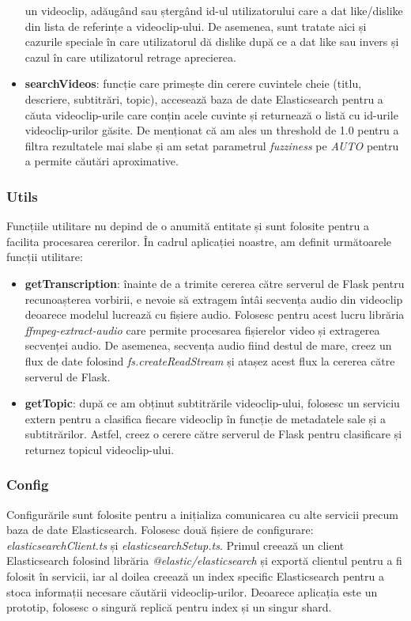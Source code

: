 \begin{itemize}
    un videoclip, adăugând sau ștergând id-ul utilizatorului care a dat like/dislike din lista de
    referințe a videoclip-ului. De asemenea, sunt tratate aici și cazurile speciale în care utilizatorul
    dă dislike după ce a dat like sau invers și cazul în care utilizatorul retrage aprecierea.
    \item \textbf{searchVideos}: funcție care primește din cerere cuvintele cheie (titlu, descriere,
    subtitrări, topic), accesează baza de date Elasticsearch pentru a căuta videoclip-urile care conțin
    acele cuvinte și returnează o listă cu id-urile videoclip-urilor găsite. De menționat că am ales
    un threshold de 1.0 pentru a filtra rezultatele mai slabe și am setat parametrul \textit{fuzziness} 
    pe \textit{AUTO} pentru a permite căutări aproximative.

    
\end{itemize}

\subsubsection{Utils}
Funcțiile utilitare nu depind de o anumită entitate și sunt folosite pentru a facilita procesarea
cererilor. În cadrul aplicației noastre, am definit următoarele funcții utilitare:

\begin{itemize}
    \item \textbf{getTranscription}: înainte de a trimite cererea către serverul de Flask pentru 
    recunoașterea vorbirii, e nevoie să extragem întâi secvența audio din videoclip deoarece 
    modelul lucrează cu fișiere audio. Folosesc pentru acest lucru librăria \textit{ffmpeg-extract-audio}
    care permite procesarea fișierelor video și extragerea secvenței audio. De asemenea, secvența
    audio fiind destul de mare, creez un flux de date folosind \textit{fs.createReadStream} și 
    atașez acest flux la cererea către serverul de Flask.
    \item \textbf{getTopic}: după ce am obținut subtitrările videoclip-ului, folosesc un serviciu
    extern pentru a clasifica fiecare videoclip în funcție de metadatele sale și a subtitrărilor.
    Astfel, creez o cerere către serverul de Flask pentru clasificare și returnez topicul videoclip-ului.
\end{itemize}

\subsubsection{Config}
Configurările sunt folosite pentru a inițializa comunicarea cu alte servicii precum baza de date
Elasticsearch. Folosesc două fișiere de configurare: \textit{elasticsearchClient.ts} și
\textit{elasticsearchSetup.ts}. Primul creează un client Elasticsearch folosind librăria
\textit{@elastic/elasticsearch} și exportă clientul pentru a fi folosit în servicii, iar al doilea
creează un index specific Elasticsearch pentru a stoca informații necesare căutării videoclip-urilor.
Deoarece aplicația este un prototip, folosesc o singură replică pentru index și un singur shard.

